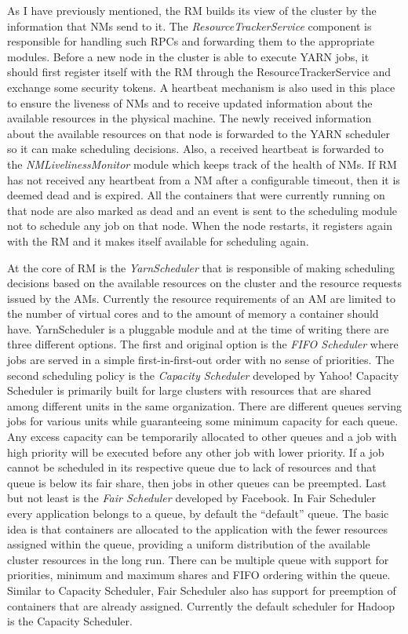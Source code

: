 As I have previously mentioned, the RM builds its view of the cluster
by the information that NMs send to it. The
\emph{ResourceTrackerService} component is responsible for handling such RPCs
and forwarding them to the appropriate modules. Before a new node in the
cluster is able to execute YARN jobs, it should first register itself
with the RM through the ResourceTrackerService and exchange some
security tokens. A heartbeat mechanism is also used in this place to
ensure the liveness of NMs and to receive updated information about
the available resources in the physical machine. The newly received
information about the available resources on that node is forwarded to the YARN
scheduler so it can make scheduling decisions. Also, a received
heartbeat is forwarded to the \emph{NMLivelinessMonitor} module which
keeps track of the health of NMs. If RM has not received any heartbeat
from a NM after a configurable timeout, then it is deemed dead and is
expired. All the containers that were currently running on that node
are also marked as dead and an event is sent to the scheduling module
not to schedule any job on that node. When the node restarts, it
registers again with the RM and it makes itself available for
scheduling again.

At the core of RM is the \emph{YarnScheduler} that is responsible of
making scheduling decisions based on the available resources on the
cluster and the resource requests issued by the AMs. Currently the
resource requirements of an AM are limited to the number of virtual
cores and to the amount of memory a container should
have. YarnScheduler is a pluggable module and at the time of writing
there are three different options. The first and original option is
the \emph{FIFO Scheduler} where jobs are served in a simple
first-in-first-out order with no sense of priorities. The second
scheduling policy is the \emph{Capacity Scheduler}
\cite{capacity_scheduler} developed by Yahoo! Capacity Scheduler
is primarily built for large clusters with resources that are shared
among different units in the same organization. There are different
queues serving jobs for various units while guaranteeing some minimum
capacity for each queue. Any excess capacity can be temporarily
allocated to other queues and a job with high priority will be executed
before any other job with lower priority. If a job cannot be scheduled
in its respective queue due to lack of resources and that queue is
below its fair share, then jobs in other queues can be preempted. Last
but not least is the \emph{Fair Scheduler} \cite{fair_scheduler}
developed by Facebook. In Fair Scheduler every application belongs to
a queue, by default the ``default'' queue. The basic idea is that
containers are allocated to the application with the fewer resources
assigned within the queue, providing a uniform distribution of the
available cluster resources in the long run. There can be multiple
queue with support for priorities, minimum and maximum shares and FIFO
ordering within the queue. Similar to Capacity Scheduler, Fair Scheduler
also has support for preemption of containers that are already
assigned. Currently the default scheduler for Hadoop is the Capacity Scheduler.

